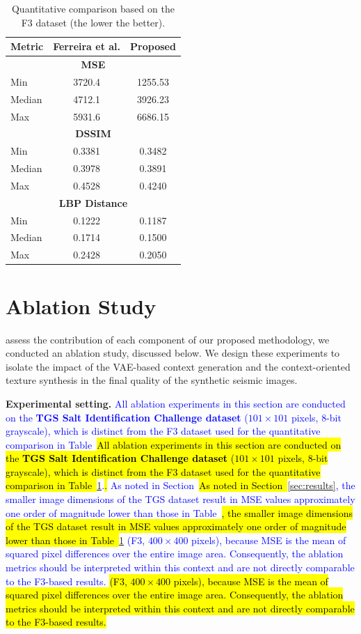 \documentclass{ieeeaccess}
\providecommand{\DIFaddbegin}{} %
\providecommand{\DIFaddend}{} %
\newcommand{\DIFaddincludegraphics}[2][]{{\color{blue}\fbox{\DIFOincludegraphics[#1]{#2}}}} %
\DeclareRobustCommand{\DIFaddbegin}{\DIFOaddbegin \let\includegraphics\DIFaddincludegraphics} %
\DeclareRobustCommand{\DIFaddend}{\DIFOaddend \let\includegraphics\DIFOincludegraphics} %
\providecommand{\DIFadd}[1]{\ifmmode\textcolor{blue}{#1}\else\hl{#1}\fi}
\renewcommand{\DIFadd}[1]{\ifmmode\textcolor{blue}{#1}\else\hl{#1}\fi}
\begin{document}
\begin{table}[htbp]
    \centering
     \caption{Quantitative comparison based on the F3 dataset (the lower the better).}
    \label{tab:metricsSummary}
    \begin{tabular}{lcc}
        \toprule
        \textbf{Metric} & \textbf{Ferreira et al.} & \textbf{Proposed} \\
        \midrule
        \multicolumn{3}{c}{\textbf{MSE}} \\
        Min & 3720.4 & 1255.53 \\
        Median & 4712.1 & 3926.23 \\
        Max & 5931.6 & 6686.15 \\
        \midrule
        \multicolumn{3}{c}{\textbf{DSSIM}} \\
        Min & 0.3381 & 0.3482 \\
        Median & 0.3978 & 0.3891 \\
        Max & 0.4528 & 0.4240 \\
        \midrule
        \multicolumn{3}{c}{\textbf{LBP Distance}} \\
        Min & 0.1222 & 0.1187 \\
        Median & 0.1714 & 0.1500 \\
        Max & 0.2428 & 0.2050 \\
        \bottomrule
    \end{tabular}
\end{table}

\newpage
\section{Ablation Study}
\label{sec:ablation}

 assess the contribution of each component of our proposed methodology, we conducted an ablation study, discussed below. We design these experiments to isolate the impact of the VAE-based context generation and the context-oriented texture synthesis in the final quality of the synthetic seismic images.

\DIFaddbegin \noindent\parbox{0.97\linewidth}{%
\textbf{Experimental setting.} \DIFadd{All ablation experiments in this section are conducted on the \textbf{TGS Salt Identification Challenge dataset} ($101 \times 101$ pixels, 8-bit grayscale), which is distinct from the F3 dataset used for the quantitative comparison in Table~}\DIFaddend \ref{tab:metricsSummary}\DIFaddbegin \DIFadd{.} \DIFadd{As noted in Section~}\DIFaddend \ref{sec:results}\DIFaddbegin \DIFadd{, the smaller image dimensions of the TGS dataset result in MSE values approximately one order of magnitude lower than those in Table~}\DIFaddend \ref{tab:metricsSummary}\DIFaddbegin \DIFadd{ (F3, $400 \times 400$ pixels), because MSE is the mean of squared pixel differences over the entire image area. Consequently, the ablation metrics should be interpreted within this context and are not directly comparable to the F3-based results.}
}
\DIFaddend
\end{document}
